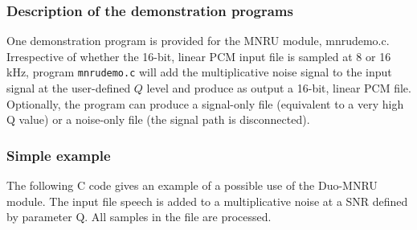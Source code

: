 \subsubsection {Description of the demonstration programs}

One demonstration program is provided for the MNRU module, mnrudemo.c.
Irrespective of whether the 16-bit, linear PCM input file is sampled at 8 or 16 kHz, program {\tt mnrudemo.c} will add
the multiplicative noise signal to the input signal at the user-defined $Q$ level and produce as output a 16-bit, linear PCM file.
Optionally, the program can produce a signal-only file (equivalent to a very high Q value) or a noise-only file (the signal path is disconnected).


\subsubsection {Simple example}

The following C code gives an example of a possible use of the Duo-MNRU module.
The input file speech is added to a multiplicative noise at a SNR defined by parameter Q.
All samples in the file are processed.

